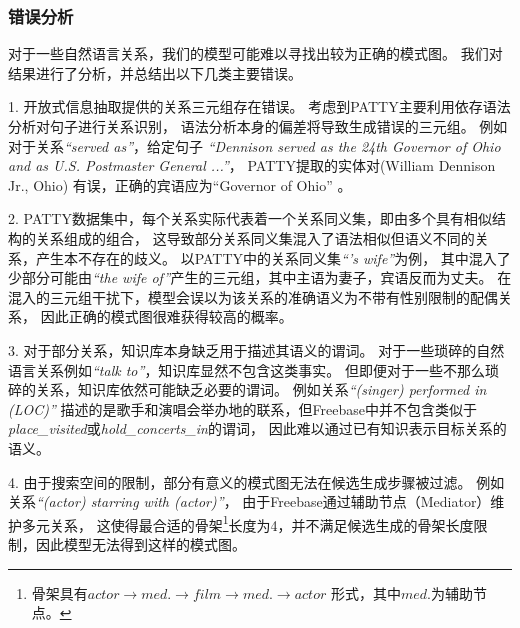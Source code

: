 \subsubsection{错误分析}

对于一些自然语言关系，我们的模型可能难以寻找出较为正确的模式图。
我们对结果进行了分析，并总结出以下几类主要错误。

1. 开放式信息抽取提供的关系三元组存在错误。
考虑到PATTY主要利用依存语法分析对句子进行关系识别，
语法分析本身的偏差将导致生成错误的三元组。
例如对于关系\textit{``served as''}，给定句子
\textit{``Dennison served as the 24th Governor of Ohio and as U.S. Postmaster General ...''}，
PATTY提取的实体对(William Dennison Jr., Ohio)
有误，正确的宾语应为``Governor of Ohio'' 。

2. PATTY数据集中，每个关系实际代表着一个关系同义集，即由多个具有相似结构的关系组成的组合，
这导致部分关系同义集混入了语法相似但语义不同的关系，产生本不存在的歧义。
以PATTY中的关系同义集\textit{``'s wife''}为例，
其中混入了少部分可能由\textit{``the wife of''}产生的三元组，其中主语为妻子，宾语反而为丈夫。
在混入的三元组干扰下，模型会误以为该关系的准确语义为不带有性别限制的配偶关系，
因此正确的模式图很难获得较高的概率。

3. 对于部分关系，知识库本身缺乏用于描述其语义的谓词。
对于一些琐碎的自然语言关系例如\textit{``talk to''}，知识库显然不包含这类事实。
但即便对于一些不那么琐碎的关系，知识库依然可能缺乏必要的谓词。
例如关系\textit{``(singer) performed in (LOC)''}	%
描述的是歌手和演唱会举办地的联系，但Freebase中并不包含类似于
\textit{place\_visited}或\textit{hold\_concerts\_in}的谓词，
因此难以通过已有知识表示目标关系的语义。

4. 由于搜索空间的限制，部分有意义的模式图无法在候选生成步骤被过滤。
例如关系\textit{``(actor) starring with (actor)''}，
由于Freebase通过辅助节点（Mediator）维护多元关系，
这使得最合适的骨架\footnote{
骨架具有$actor \rightarrow med. \rightarrow film \rightarrow med. \rightarrow actor$
形式，其中$med.$为辅助节点。}长度为4，并不满足候选生成的骨架长度限制，因此模型无法得到这样的模式图。

%

